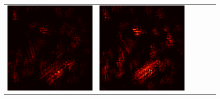 \documentclass[preprint,12pt]{elsarticle}
\begin{document}
\begin{figure}[p]
\begin{tabular}{cccccc}
  \includegraphics[scale=\scale]{../visualizations/examples/imagenette/cnn/active_saliency_map/2.png} & 
  \includegraphics[scale=\scale]{../visualizations/examples/imagenette/cnn/inactive_saliency_map/2.png} \\
  

\end{tabular}
\end{figure}
\end{document}
